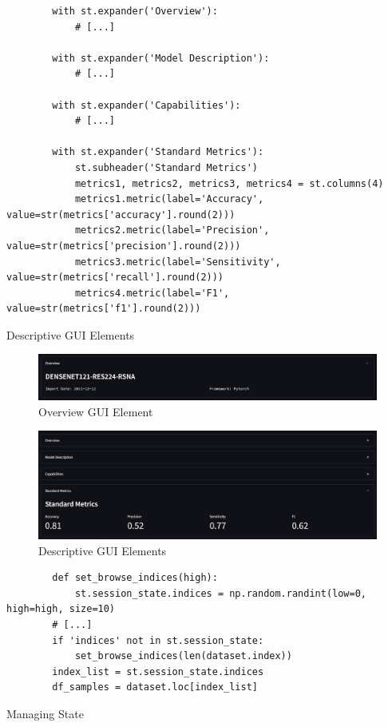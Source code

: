 \documentclass[11pt,a4paper,english]{scrreprt}
\begin{document}
\begin{listing}[htpb]
    \begin{verbatim}
        with st.expander('Overview'):
            # [...]

        with st.expander('Model Description'):
            # [...]

        with st.expander('Capabilities'):
            # [...]

        with st.expander('Standard Metrics'):
            st.subheader('Standard Metrics')
            metrics1, metrics2, metrics3, metrics4 = st.columns(4)
            metrics1.metric(label='Accuracy', value=str(metrics['accuracy'].round(2)))
            metrics2.metric(label='Precision', value=str(metrics['precision'].round(2)))
            metrics3.metric(label='Sensitivity', value=str(metrics['recall'].round(2)))
            metrics4.metric(label='F1', value=str(metrics['f1'].round(2)))
    \end{verbatim}
    \caption{Descriptive GUI Elements}
    \label{listing:descriptive_elements}
\end{listing}

\begin{figure}[htbp]
    \centering
    \includegraphics[width=\textwidth]{img/screenshots/overview_element.jpg}
    \caption{Overview GUI Element}
    \label{fig:overview_element}
\end{figure}

\begin{figure}[htbp]
    \centering
    \includegraphics[width=\textwidth]{img/screenshots/descriptive_elements.jpg}
    \caption{Descriptive GUI Elements}
    \label{fig:descriptive_elements}
\end{figure}

\begin{listing}[htpb]
    \begin{verbatim}
        def set_browse_indices(high):
            st.session_state.indices = np.random.randint(low=0, high=high, size=10)
        # [...]
        if 'indices' not in st.session_state:
            set_browse_indices(len(dataset.index))
        index_list = st.session_state.indices
        df_samples = dataset.loc[index_list]
    \end{verbatim}
    \caption{Managing State}
    \label{listing:managing_state}
\end{listing}
\end{document}
